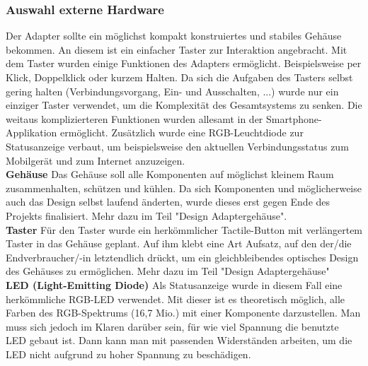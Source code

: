 \documentclass[11pt, twoside]{article}
\begin{document}
\subsubsection{Auswahl externe Hardware}
Der Adapter sollte ein möglichst kompakt konstruiertes und stabiles Gehäuse bekommen. An diesem ist ein einfacher Taster zur Interaktion angebracht. Mit dem Taster wurden einige Funktionen des Adapters ermöglicht. Beispielsweise per Klick, Doppelklick oder kurzem Halten. Da sich die Aufgaben des Tasters selbst gering halten (Verbindungsvorgang, Ein- und Ausschalten, ...) wurde nur ein einziger Taster verwendet, um die Komplexität des Gesamtsystems zu senken. Die weitaus komplizierteren Funktionen wurden allesamt in der Smartphone-Applikation ermöglicht. Zusätzlich wurde eine RGB-Leuchtdiode zur Statusanzeige verbaut, um beispielsweise den aktuellen Verbindungsstatus zum Mobilgerät und zum Internet anzuzeigen. \newline \\
\textbf{Gehäuse} \newline
Das Gehäuse soll alle Komponenten auf möglichst kleinem Raum zusammenhalten, schützen und kühlen. Da sich Komponenten und möglicherweise auch das Design selbst laufend änderten, wurde dieses erst gegen Ende des Projekts finalisiert. Mehr dazu im Teil "Design Adaptergehäuse". \newline \\
\textbf{Taster} \newline
Für den Taster wurde ein herkömmlicher Tactile-Button mit verlängertem Taster in das Gehäuse geplant. Auf ihm klebt eine Art Aufsatz, auf den der/die Endverbraucher/-in letztendlich drückt, um ein gleichbleibendes optisches Design des Gehäuses zu ermöglichen. Mehr dazu im Teil "Design Adaptergehäuse"\newline \\
\textbf{LED (Light-Emitting Diode)} \newline
Als Statusanzeige wurde in diesem Fall eine herkömmliche RGB-LED verwendet. Mit dieser ist es theoretisch möglich, alle Farben des RGB-Spektrums (16,7 Mio.) mit einer Komponente darzustellen.\newline
Man muss sich jedoch im Klaren darüber sein, für wie viel Spannung die benutzte LED gebaut ist. Dann kann man mit passenden Widerständen arbeiten, um die LED nicht aufgrund zu hoher Spannung zu beschädigen. \parencite[vgl.][]{noauthor_urlnl05_nodate}
\end{document}
